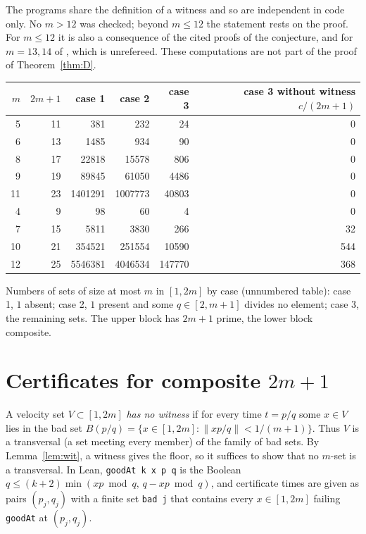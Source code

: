 \documentclass[11pt]{article}
\theoremstyle{remark}
\newcommand{\norm}[1]{\lVert #1\rVert}
\begin{document}
The programs share the definition of a witness and so are independent in code only. No $m>12$ was checked; beyond $m\le12$ the statement rests on the proof. For $m\le12$ it is also a consequence of the cited proofs of the conjecture, and for $m=13,14$ of \cite{All26}, which is unrefereed. These computations are not part of the proof of Theorem~\ref{thm:D}.

\begin{center}
\begin{tabular}{rrrrrr}
\toprule
$m$ & $2m+1$ & case 1 & case 2 & case 3 & case 3 without witness $c/(2m+1)$\\
\midrule
5 & 11 & 381 & 232 & 24 & 0\\
6 & 13 & 1485 & 934 & 90 & 0\\
8 & 17 & 22818 & 15578 & 806 & 0\\
9 & 19 & 89845 & 61050 & 4486 & 0\\
11 & 23 & 1401291 & 1007773 & 40803 & 0\\
\midrule
4 & 9 & 98 & 60 & 4 & 0\\
7 & 15 & 5811 & 3830 & 266 & 32\\
10 & 21 & 354521 & 251554 & 10590 & 544\\
12 & 25 & 5546381 & 4046534 & 147770 & 368\\
\bottomrule
\end{tabular}

\smallskip\noindent\begin{minipage}{0.92\textwidth}\small Numbers of sets of size at most $m$ in $[1,2m]$ by case (unnumbered table): case 1, $1$ absent; case 2, $1$ present and some $q\in[2,m+1]$ divides no element; case 3, the remaining sets. The upper block has $2m+1$ prime, the lower block composite.\end{minipage}
\end{center}

\section{Certificates for composite $2m+1$}\label{sec:cert}

A velocity set $V\subset[1,2m]$ \emph{has no witness} if for every time $t=p/q$ some $x\in V$ lies in the bad set $B(p/q)=\{x\in[1,2m]:\norm{xp/q}<1/(m+1)\}$. Thus $V$ is a transversal (a set meeting every member) of the family of bad sets. By Lemma~\ref{lem:wit}, a witness gives the floor, so it suffices to show that no $m$-set is a transversal. In Lean, \texttt{goodAt k x p q} is the Boolean $q\le(k+2)\min(xp\bmod q,\,q-xp\bmod q)$, and certificate times are given as pairs $(p_j,q_j)$ with a finite set \texttt{bad j} that contains every $x\in[1,2m]$ failing \texttt{goodAt} at $(p_j,q_j)$.
\end{document}

